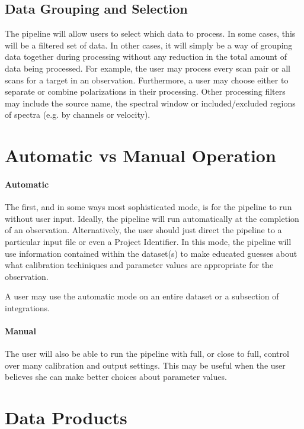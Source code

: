 \subsection{Data Grouping and Selection}

The pipeline will allow users to select which data to process.  In some cases, this will be a filtered set of data.  In other cases, it will simply be a way of grouping data together during processing without any reduction in the total amount of data being processed.  For example, the user may process every scan pair or all scans for a target in an observation.  Furthermore, a user may choose either to separate or combine polarizations in their processing.  Other processing filters may include the source name, the spectral window or included/excluded regions of spectra (e.g. by channels or velocity).

\section{Automatic vs Manual Operation}

\paragraph{Automatic}

The first, and in some ways most sophisticated mode, is for the pipeline to run without user input.  Ideally, the pipeline will run automatically at the completion of an observation.  Alternatively, the user should just direct the pipeline to a particular input file or even a Project Identifier.  In this mode, the pipeline will use information contained within the dataset(s) to make educated guesses about what calibration techiniques and parameter values are appropriate for the observation.

A user may use the automatic mode on an entire dataset or a subsection of integrations.

\paragraph{Manual}

The user will also be able to run the pipeline with full, or close to full, control over many calibration and output settings.  This may be useful when the user believes she can make better choices about parameter values.

\section{Data Products}

